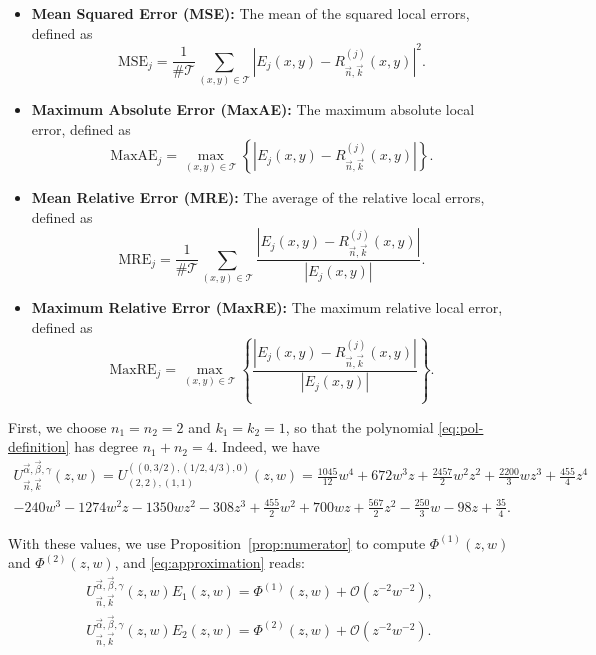 \documentclass[11pt,reqno]{amsart}
\theoremstyle{definition}
\begin{document}
\begin{itemize}
    \item \textbf{Mean Squared Error (MSE):} The mean of the squared local errors, defined as
    $$
    \mathrm{MSE}_j = \frac{1}{\#\mathcal{T}} \sum_{(x,y) \in \mathcal{T}} \left|E_j(x,y) - R_{\vec n,\vec k}^{(j)}(x,y)\right|^2. 
    $$
    \item \textbf{Maximum Absolute Error (MaxAE):} The maximum absolute local error, defined as
    $$
    \mathrm{MaxAE}_j = \max_{(x,y) \in \mathcal{T}} \left\{ \left| E_j(x,y) - R_{\vec n,\vec k}^{(j)}(x,y) \right| \right\}.
    $$
    \item \textbf{Mean Relative Error (MRE):} The average of the relative local errors, defined as
    $$
    \mathrm{MRE}_j = \frac{1}{\#\mathcal{T}} \sum_{(x,y) \in \mathcal{T}} \frac{\left| E_j(x,y) - R_{\vec n,\vec k}^{(j)}(x,y) \right|}{\left| E_j(x,y) \right|}.
    $$
    \item \textbf{Maximum Relative Error (MaxRE):} The maximum relative local error, defined as
    $$
    \mathrm{MaxRE}_j = \max_{(x,y) \in \mathcal{T}} \left\{ \frac{\left| E_j(x,y) - R_{\vec n,\vec k}^{(j)}(x,y) \right|}{\left| E_j(x,y) \right|} \right\}.
    $$


\end{itemize}


First, we choose $n_1 = n_2 = 2$ and $k_1=k_2=1$, so that the polynomial \eqref{eq:pol-definition} has degree $n_1+n_2=4$. Indeed, we have
\begin{multline}
    U_{\vec n,\vec k}^{\vec\alpha,\vec \beta,\gamma}(z,w)=U^{((0,3/2),(1/2,4/3),0)}_{(2,2),(1,1)}(z,w)=\frac{1045}{12}w^4 +672 w^3 z+\frac{2457 }{2}w^2 z^2+\frac{2200 }{3}w z^3+\frac{455 }{4}z^4\\-240 w^3-1274 w^2 z-1350 w z^2-308 z^3+\frac{455 }{2}w^2+700 w z+\frac{567 }{2}z^2-\frac{250 }{3}w-98 z+\frac{35}{4}.
\end{multline}

With these values, we use Proposition~\ref{prop:numerator} to compute $\Phi^{(1)}(z,w)$ and $\Phi^{(2)}(z,w)$, and \eqref{eq:approximation} reads: 
\begin{equation*}
    \begin{array}{c}
         U_{\vec n,\vec k}^{\vec\alpha,\vec \beta,\gamma}(z,w) E_1(z,w) = \Phi^{(1)}(z,w) + \mathcal{O}(z^{-2}w^{-2}), \\[5pt]
         
         U_{\vec n,\vec k}^{\vec\alpha,\vec \beta,\gamma}(z,w) E_2(z,w) = \Phi^{(2)}(z,w) + \mathcal{O}(z^{-2}w^{-2}). \\
    \end{array}
\end{equation*}
\end{document}
